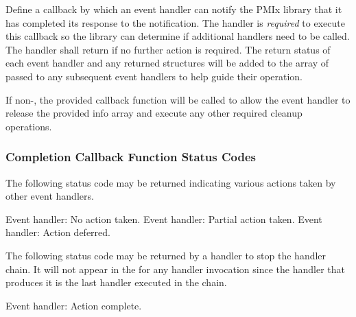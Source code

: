 \descr

Define a callback by which an event handler can notify the \ac{PMIx} library that it has completed its response to the notification. The handler is \textit{required} to execute this callback so the library can determine if additional handlers need to be called. The handler shall return  if no further action is required. The return status of each event handler and any returned  structures will be added to the  array of  passed to any subsequent event handlers to help guide their operation.

If non-, the provided callback function will be called to allow the event handler to release the provided info array and execute any other required cleanup operations.

\subsubsection{Completion Callback Function Status Codes}

The following status code may be returned indicating various actions taken by other event handlers.

\begin{constantdesc}
%
Event handler: No action taken.
%
Event handler: Partial action taken.
%
Event handler: Action deferred.
\end{constantdesc}
%

The following status code may be returned by a handler to stop the handler chain.  It will not appear in the  for any handler invocation since the handler that produces it is the last handler executed in the chain.

\begin{constantdesc}
%
Event handler: Action complete.
\end{constantdesc}
%


